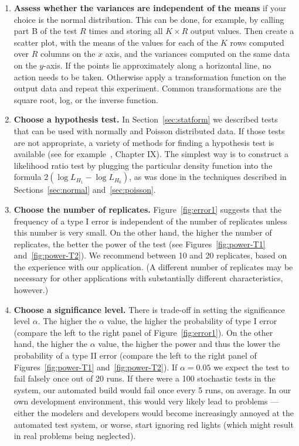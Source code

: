 \documentclass{sig-alternate-preprint}
\begin{document}
\begin{enumerate}
\item
\label{assess-variances}
{\bf Assess whether the variances are independent of the means} if your
choice is the normal distribution.  This can be done, for example, by
calling part B of the test $R$ times and storing all $K\times R$ output
values. Then create a scatter plot, with the means of the values for each
of the $K$ rows computed over $R$ columns on the $x$ axis, and the
variances computed on the same data on the $y$-axis.  If the points lie
approximately along a horizontal line, no action needs to be taken.
Otherwise apply a transformation function on the output data and repeat
this experiment.  Common transformations are the square root, log, or the
inverse function.

\item
\label{choose-hypothesis-test}
{\bf Choose a hypothesis test.}  In Section~\ref{sec:statform} we described
tests that can be used with normally and Poisson distributed data. If those
tests are not appropriate, a variety of methods for finding a hypothesis test
is available (see for example~\cite{mood-book-1974}, Chapter IX). The simplest
way is to construct a likelihood ratio test by plugging the particular density
function into the formula $2(\log L_{H_1} - \log L_{H_0})$, as was done in
the techniques described in Sections~\ref{sec:normal} and~\ref{sec:poisson}.

\item
{\bf Choose the number of replicates.}  Figure~\ref{fig:error1} suggests
that the frequency of a type I error is independent of the number of
replicates unless this number is very small. On the other hand, the higher
the number of replicates, the better the power of the test (see
Figures~\ref{fig:power-T1} and~\ref{fig:power-T2}). We recommend between 10
and 20 replicates, based on the experience with our application.  (A
different number of replicates may be necessary for other applications with
substantially different characteristics, however.)

\item
\label{choose-significance-level}
{\bf Choose a significance level.}  There is trade-off in setting the
significance level $\alpha$. The higher the $\alpha$ value, the higher the
probability of type I error (compare the left to the right panel of
Figure~\ref{fig:error1}). On the other hand, the higher the $\alpha$ value,
the higher the power and thus the lower the probability of a type II error
(compare the left to the right panel of
Figures~\ref{fig:power-T1} and~\ref{fig:power-T2}). If $\alpha=0.05$ we
expect the test to fail falsely once out of 20 runs.  If there were a 100
stochastic tests in the system, our automated build would fail once every 5
runs, on average.  In our own development environment, this would very
likely lead to problems --- either the modelers and developers would become
increasingly annoyed at the automated test system, or worse, start ignoring
red lights (which might result in real problems being neglected).
  

\end{enumerate}
\end{document}
